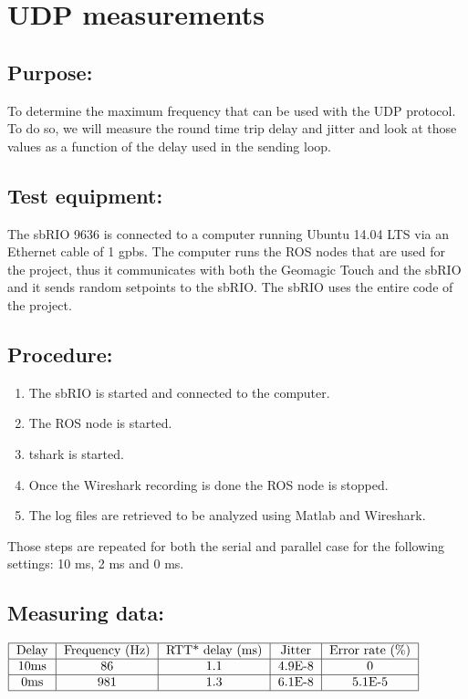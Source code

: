 \section{UDP measurements}\label{sec_udp_mes}

\subsection*{Purpose:}

To determine the maximum frequency that can be used with the UDP protocol. To do so, we will measure the round time trip delay and jitter and look at those values as a function of the delay used in the sending loop.

\subsection*{Test equipment:}

The sbRIO 9636 is connected to a computer running Ubuntu 14.04 LTS via an Ethernet cable of 1 gpbs. The computer runs the ROS nodes that are used for the project, thus it communicates with both the Geomagic Touch and the sbRIO and it sends random setpoints to the sbRIO. The sbRIO uses the entire code of the project.

\subsection*{Procedure:}

\begin{enumerate}
	\item The sbRIO is started and connected to the computer.
	\item The ROS node is started.
	\item tshark is started.%
	\item Once the Wireshark recording is done the ROS node is stopped.
	\item The log files are retrieved to be analyzed using Matlab and Wireshark.
\end{enumerate}
Those steps are repeated for both the serial and parallel case for the following settings: 10 ms, 2 ms and 0 ms.


\subsection*{Measuring data:}

\begin{center}
  $\begin{tabular}{|c|c|c|c|c|c|}
    \hline
    \text{Delay} & \text{Frequency (Hz)} & \text{RTT* delay (ms)} & \text{Jitter} & \text{Error rate (\%)}\\
    \hline
    10ms & 86 & 1.1 & 4.9E-8 & 0 \\
    \hline
    0ms & 981 & 1.3 & 6.1E-8 & 5.1E-5 \\
    \hline
  \end{tabular}$
\end{center}{}


